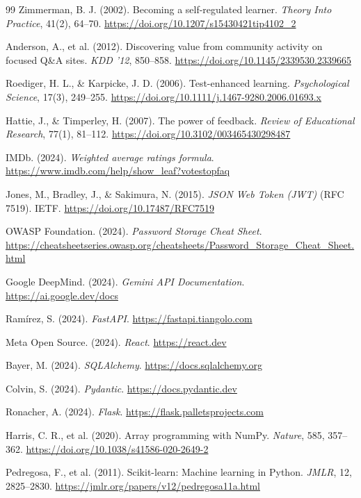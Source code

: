 \documentclass[12pt,a4paper]{report}
\begin{document}
{\begin{thebibliography}{99}
Zimmerman, B. J. (2002). Becoming a self-regulated learner. \textit{Theory Into Practice}, 41(2), 64--70. \url{https://doi.org/10.1207/s15430421tip4102_2}

Anderson, A., et al. (2012). Discovering value from community activity on focused Q\&A sites. \textit{KDD '12}, 850--858. \url{https://doi.org/10.1145/2339530.2339665}

Roediger, H. L., \& Karpicke, J. D. (2006). Test-enhanced learning. \textit{Psychological Science}, 17(3), 249--255. \url{https://doi.org/10.1111/j.1467-9280.2006.01693.x}

Hattie, J., \& Timperley, H. (2007). The power of feedback. \textit{Review of Educational Research}, 77(1), 81--112. \url{https://doi.org/10.3102/003465430298487}

IMDb. (2024). \textit{Weighted average ratings formula}. \url{https://www.imdb.com/help/show_leaf?votestopfaq}

Jones, M., Bradley, J., \& Sakimura, N. (2015). \textit{JSON Web Token (JWT)} (RFC 7519). IETF. \url{https://doi.org/10.17487/RFC7519}

OWASP Foundation. (2024). \textit{Password Storage Cheat Sheet}. \url{https://cheatsheetseries.owasp.org/cheatsheets/Password_Storage_Cheat_Sheet.html}

Google DeepMind. (2024). \textit{Gemini API Documentation}. \url{https://ai.google.dev/docs}

Ramírez, S. (2024). \textit{FastAPI}. \url{https://fastapi.tiangolo.com}

Meta Open Source. (2024). \textit{React}. \url{https://react.dev}

Bayer, M. (2024). \textit{SQLAlchemy}. \url{https://docs.sqlalchemy.org}

Colvin, S. (2024). \textit{Pydantic}. \url{https://docs.pydantic.dev}

Ronacher, A. (2024). \textit{Flask}. \url{https://flask.palletsprojects.com}

Harris, C. R., et al. (2020). Array programming with NumPy. \textit{Nature}, 585, 357--362. \url{https://doi.org/10.1038/s41586-020-2649-2}

Pedregosa, F., et al. (2011). Scikit-learn: Machine learning in Python. \textit{JMLR}, 12, 2825--2830. \url{https://jmlr.org/papers/v12/pedregosa11a.html}


\end{thebibliography}}
\end{document}
